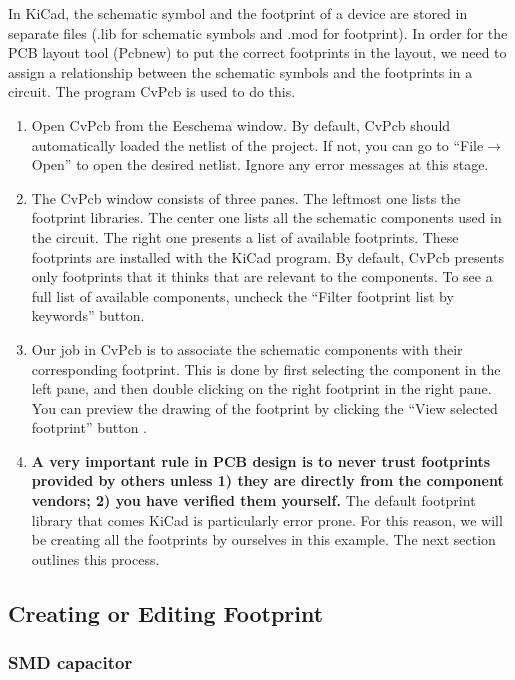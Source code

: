 \documentclass[12pt,letterpaper]{scrartcl}
\begin{document}
In KiCad, the schematic symbol and the footprint of a device are stored in separate files (.lib for schematic symbols and .mod for footprint). In order for the PCB layout tool (Pcbnew) to put the correct footprints in the layout, we need to assign a relationship between the schematic symbols and the footprints in a circuit. The program CvPcb is used to do this. 

\begin{enumerate}
	\item Open CvPcb from the Eeschema window. By default, CvPcb should automatically loaded the netlist of the project. If not, you can go to ``File$\rightarrow$Open'' to open the desired netlist. Ignore any error messages at this stage.
	
	\item The CvPcb window consists of three panes. The leftmost one lists the footprint libraries. The center one lists all the schematic components used in the circuit. The right one presents a list of available footprints. These footprints are installed with the KiCad program. By default, CvPcb presents only footprints that it thinks that are relevant to the components. To see a full list of available components, uncheck the ``Filter footprint list by keywords'' button. 
	
	\item Our job in CvPcb is to associate the schematic components with their corresponding footprint. This is done by first selecting the component in the left pane, and then double clicking on the right footprint in the right pane. You can preview the drawing of the footprint by clicking the ``View selected footprint'' button . 
	
	\item \textbf{A very important rule in PCB design is to never trust footprints provided by others unless 1) they are directly from the component vendors; 2) you have verified them yourself.} The default footprint library that comes KiCad is particularly error prone. For this reason, we will be creating all the footprints by ourselves in this example. The next section outlines this process. 
\end{enumerate}

\subsection{Creating or Editing Footprint}

\subsubsection{SMD capacitor}
\label{sec:smd_cap_footprint}
\end{document}
